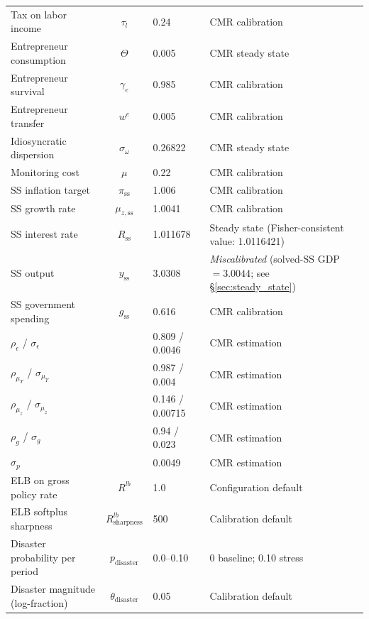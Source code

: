 \documentclass[11pt]{article}
\begin{document}
\begin{table}[h!]
\begin{tabular}{lcll}
Tax on labor income & $\tau_l$ & 0.24 & CMR calibration \\[3pt]
Entrepreneur consumption & $\Theta$ & 0.005 & CMR steady state \\
Entrepreneur survival & $\gamma_e$ & 0.985 & CMR calibration \\
Entrepreneur transfer & $w^e$ & 0.005 & CMR calibration \\
Idiosyncratic dispersion & $\sigma_\omega$ & 0.26822 & CMR steady state \\
Monitoring cost & $\mu$ & 0.22 & CMR calibration \\[3pt]
SS inflation target & $\pi_{\text{ss}}$ & 1.006 & CMR calibration \\
SS growth rate & $\mu_{z,\text{ss}}$ & 1.0041 & CMR calibration \\
SS interest rate & $R_{\text{ss}}$ & 1.011678 & Steady state (Fisher-consistent value: 1.0116421) \\
SS output & $y_{\text{ss}}$ & 3.0308 & \emph{Miscalibrated} (solved-SS GDP $= 3.0044$; see \S\ref{sec:steady_state}) \\
SS government spending & $g_{\text{ss}}$ & 0.616 & CMR calibration \\[3pt]
$\rho_\epsilon$ / $\sigma_\epsilon$ & & 0.809 / 0.0046 & CMR estimation \\
$\rho_{\mu_\Upsilon}$ / $\sigma_{\mu_\Upsilon}$ & & 0.987 / 0.004 & CMR estimation \\
$\rho_{\mu_z}$ / $\sigma_{\mu_z}$ & & 0.146 / 0.00715 & CMR estimation \\
$\rho_g$ / $\sigma_g$ & & 0.94 / 0.023 & CMR estimation \\
$\sigma_p$ & & 0.0049 & CMR estimation \\[3pt]
ELB on gross policy rate & $R^{lb}$ & 1.0 & Configuration default \\
ELB softplus sharpness & $R^{lb}_{\text{sharpness}}$ & 500 & Calibration default \\
Disaster probability per period & $p_{\text{disaster}}$ & 0.0--0.10 & 0 baseline; 0.10 stress \\
Disaster magnitude (log-fraction) & $\theta_{\text{disaster}}$ & 0.05 & Calibration default \\
\bottomrule
\end{tabular}
\end{table}
\end{document}

